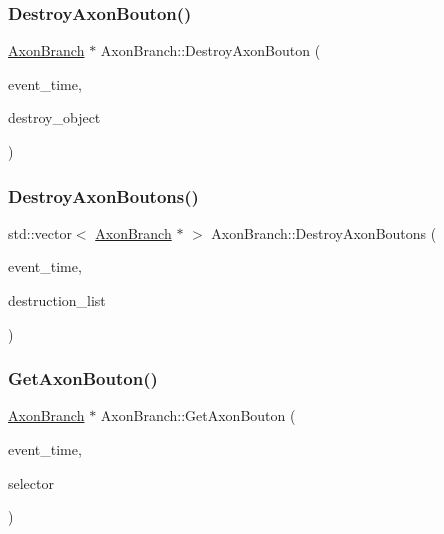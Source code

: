 \mbox{\label{classAxonBranch_a024c8666555702ebe67e2a5caf1b866a}} 
\subsubsection{\texorpdfstring{Destroy\+Axon\+Bouton()}{DestroyAxonBouton()}}
{\footnotesize\ttfamily \mbox{\hyperlink{classAxonBranch}{Axon\+Branch}} $\ast$ Axon\+Branch\+::\+Destroy\+Axon\+Bouton (\begin{DoxyParamCaption}\item[{std\+::chrono\+::time\+\_\+point$<$ \mbox{\hyperlink{universe_8h_a0ef8d951d1ca5ab3cfaf7ab4c7a6fd80}{Clock}} $>$}]{event\+\_\+time,  }\item[{\mbox{\hyperlink{classAxonBranch}{Axon\+Branch}} $\ast$}]{destroy\+\_\+object }\end{DoxyParamCaption})}

\mbox{\label{classAxonBranch_a8c022977e091b8cab367b21c0c4930ea}} 
\subsubsection{\texorpdfstring{Destroy\+Axon\+Boutons()}{DestroyAxonBoutons()}}
{\footnotesize\ttfamily std\+::vector$<$ \mbox{\hyperlink{classAxonBranch}{Axon\+Branch}} $\ast$ $>$ Axon\+Branch\+::\+Destroy\+Axon\+Boutons (\begin{DoxyParamCaption}\item[{std\+::chrono\+::time\+\_\+point$<$ \mbox{\hyperlink{universe_8h_a0ef8d951d1ca5ab3cfaf7ab4c7a6fd80}{Clock}} $>$}]{event\+\_\+time,  }\item[{std\+::vector$<$ \mbox{\hyperlink{classAxonBranch}{Axon\+Branch}} $\ast$$>$}]{destruction\+\_\+list }\end{DoxyParamCaption})}

\mbox{\label{classAxonBranch_a6fa6eea91e72fd142f3d691f7ca4c99a}} 
\subsubsection{\texorpdfstring{Get\+Axon\+Bouton()}{GetAxonBouton()}}
{\footnotesize\ttfamily \mbox{\hyperlink{classAxonBranch}{Axon\+Branch}} $\ast$ Axon\+Branch\+::\+Get\+Axon\+Bouton (\begin{DoxyParamCaption}\item[{std\+::chrono\+::time\+\_\+point$<$ \mbox{\hyperlink{universe_8h_a0ef8d951d1ca5ab3cfaf7ab4c7a6fd80}{Clock}} $>$}]{event\+\_\+time,  }\item[{int}]{selector }\end{DoxyParamCaption})}

